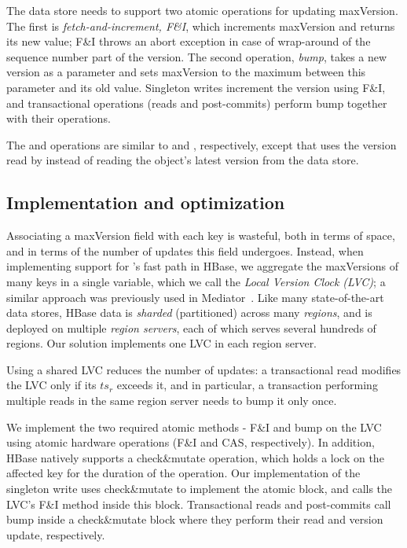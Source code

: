 The data store needs to support two atomic operations for updating {maxVersion}.
The first is \emph{fetch-and-increment, F\&I}, which increments {maxVersion} and returns its
new value; F\&I throws an abort exception in case of wrap-around of the 
sequence number part  of 
the version. The second operation, \emph{bump}, takes a new version  as a parameter and
sets  {maxVersion} to the maximum between this parameter and its old value.
Singleton writes  increment the version using F\&I, and transactional operations (reads and post-commits)
perform { bump} together with their operations. 

The   and  operations are similar to  and , 
respectively, except that  uses the version read by  instead of 
reading the object's latest  version from the data store.

\subsection{Implementation and optimization}
\label{ssec:fast-impl}


Associating a maxVersion field with each key is wasteful,
both in terms of space, and in terms of the number of updates this field undergoes.
Instead, when implementing support for \sys's fast path in HBase, we aggregate the maxVersions of many keys in a single variable, which we call the \emph{Local Version Clock (LVC)};
a similar approach was previously used in Mediator~\cite{mediator}.
Like many state-of-the-art data stores, HBase data is \emph{sharded} (partitioned) 
across many \emph{regions}, and is deployed on multiple  \emph{region servers}, each of which serves
several hundreds of regions. Our solution implements one LVC in each region server. 

Using a shared LVC reduces the number of updates:  
a transactional read modifies the LVC only if its $ts_r$ exceeds it, and in particular, 
a transaction performing multiple reads in the same region server needs to bump it only once. 

We implement the two required atomic methods - F\&I and bump on the LVC using atomic hardware operations (F\&I and CAS, respectively). 
In addition, 
HBase   natively supports  a check\&mutate operation, which holds a lock on the affected key for the duration of the operation.
Our implementation of the singleton write uses  check\&mutate to implement the atomic block, and calls the LVC's F\&I method inside this block.
Transactional reads and post-commits call bump inside a check\&mutate  block where they perform their read and version update, respectively. 

